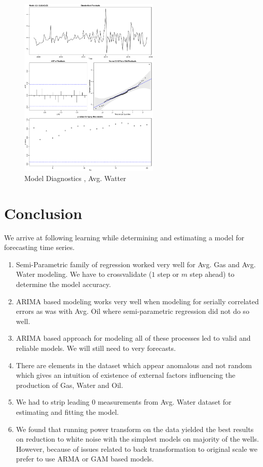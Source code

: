 \documentclass[a4paper]{article}
\begin{document}
\begin{enumerate}
	\begin{figure}
	\centering
	\includegraphics[width=0.6\textwidth]{Sarima_Water_Final}
	\caption{Model Diagnostics , Avg. Watter}
	\label{fig1:Sarima_Water_Final}
\end{figure}

\end{enumerate}
	\newpage
\section{Conclusion}

We arrive at following learning while determining and estimating a model for forecasting time series. 

\begin{enumerate}
	\item Semi-Parametric family of regression worked very well for Avg. Gas and Avg. Water modeling. We have to crossvalidate ($1$ step or $m$ step ahead) to determine the model accuracy. 
	\item ARIMA based modeling works very well when modeling for serially correlated errors as was with Avg. Oil where semi-parametric regression did not do so well. 
	\item ARIMA based approach for modeling all of these processes led to valid and reliable models. We will still need to very forecasts. 
	\item There are elements in the dataset which appear anomalous and not random which gives an intuition of existence of external factors influencing the production of Gas, Water and Oil. 
	\item We had to strip leading $0$ measurements from Avg. Water dataset for estimating and fitting the model. 
	\item We found that running power transform on the data yielded the best results on reduction to white noise with the simplest models on majority of the wells. However, because of issues related to back transformation to original scale we prefer to use ARMA or GAM based models.  
\end{enumerate}


\newpage


\end{document}
